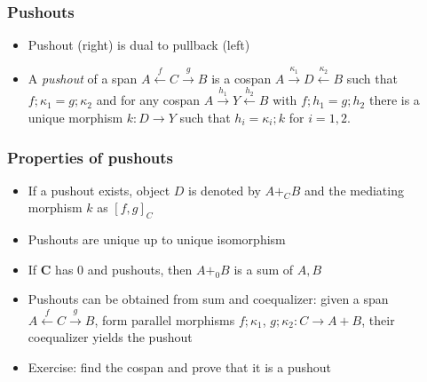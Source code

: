 \documentclass[handout]{beamer}
\newcommand{\bfsf}[1]{{\boldsymbol{#1}}}
\newcommand{\CC}{\bfsf{C}}
\begin{document}
\frame
  {   
    \frametitle{Pushouts}\label{Ch4:Push}

 \begin{itemize}[<+->]
\item Pushout (right) is dual to pullback (left)
\item A \emph{pushout} of a span
$A\stackrel{f}{\leftarrow} C \stackrel{g}{\to}B$
is a cospan $A\stackrel{\kappa_1}{\to} D \stackrel{\kappa_2}{\leftarrow}B$ such that 
$f;\kappa_1=g;\kappa_2$ and for any cospan 
$A\stackrel{h_1}{\to} Y \stackrel{h_2}{\leftarrow}B$
with $f;h_1 = g;h_2$
there is a unique morphism $k: D\to Y$
such that $h_i = \kappa_i;k$ for $i=1,2$.
 \end{itemize}

 }


\frame
  {   
    \frametitle{Properties of pushouts}\label{Ch4:PushoProp}

 \begin{itemize}[<+->]
\item If a pushout exists, object $D$ is denoted by $A+_C B$ 
and the mediating morphism $k$ as $[f,g]_C$
\item Pushouts are unique up to unique isomorphism
\item If $\CC$ has 0 and pushouts, then $A+_0 B$ is a sum of $A,B$ 
\item Pushouts can be obtained from sum and coequalizer:
given a span $A\stackrel{f}{\leftarrow} C \stackrel{g}{\to}B$,
form parallel morphisms $f;\kappa_1$, $g;\kappa_2: C\to A+B$,
their coequalizer yields the pushout
\item Exercise: find the cospan and prove that it is a pushout
 \end{itemize}

 }
\end{document}
